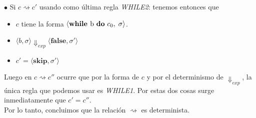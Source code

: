 \documentclass[11pt]{article}
\begin{document}

$\bullet$ Si $ c \rightsquigarrow c' $ usando como última regla \emph{WHILE2}: tenemos entonces que
\begin{itemize}
      \item $c$ tiene la forma $ \langle \textbf{while } \text{b \textbf{do} } c_0, \; \sigma \rangle$.
      \item $ \langle b, \sigma \rangle \Downarrow_{exp} \langle \textbf{false}, \sigma' \rangle$
      \item $c' = \langle \textbf{skip}, \sigma' \rangle$
\end{itemize}

Luego en $ c \rightsquigarrow c'' $ ocurre que por la forma de $c$ y por el determinismo
de $\Downarrow_{exp}$, la única regla que podemos usar es \emph{WHILE1}. Por estas dos cosas
surge inmediatamente que $c' = c''$. \\

Por lo tanto, concluimos que la relación $ \rightsquigarrow $ es determinista.
\end{document}
